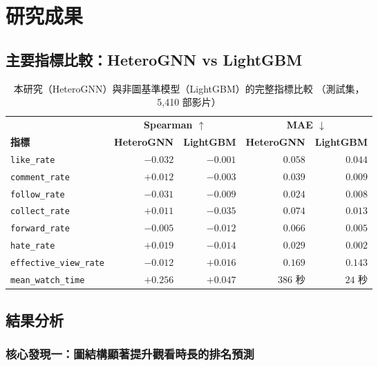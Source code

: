 \documentclass[12pt, a4paper]{article}
\begin{document}
\section{研究成果}
\label{sec:results}

\subsection{主要指標比較：HeteroGNN vs LightGBM}

\begin{table}[H]
\centering
\caption{本研究（HeteroGNN）與非圖基準模型（LightGBM）的完整指標比較
         （測試集，5,410 部影片）}
\label{tab:main_results}
\small
\begin{tabular}{lrrrr}
\toprule
& \multicolumn{2}{c}{\textbf{Spearman $\uparrow$}} & \multicolumn{2}{c}{\textbf{MAE $\downarrow$}} \\
\cmidrule(lr){2-3}\cmidrule(lr){4-5}
\textbf{指標} & \textbf{HeteroGNN} & \textbf{LightGBM}
              & \textbf{HeteroGNN} & \textbf{LightGBM} \\
\midrule
\texttt{like\_rate}            & $-0.032$ & $-0.001$ & $0.058$ & $0.044$ \\
\texttt{comment\_rate}         & $+0.012$ & $-0.003$ & $0.039$ & $0.009$ \\
\texttt{follow\_rate}          & $-0.031$ & $-0.009$ & $0.024$ & $0.008$ \\
\texttt{collect\_rate}         & $+0.011$ & $-0.035$ & $0.074$ & $0.013$ \\
\texttt{forward\_rate}         & $-0.005$ & $-0.012$ & $0.066$ & $0.005$ \\
\texttt{hate\_rate}            & $+0.019$ & $-0.014$ & $0.029$ & $0.002$ \\
\texttt{effective\_view\_rate} & $-0.012$ & $+0.016$ & $0.169$ & $0.143$ \\
\texttt{mean\_watch\_time}     & $\mathbf{+0.256}$ & $+0.047$ & $386$ 秒 & $24$ 秒 \\
\bottomrule
\end{tabular}
\end{table}

\subsection{結果分析}

\subsubsection{核心發現一：圖結構顯著提升觀看時長的排名預測}
\end{document}
